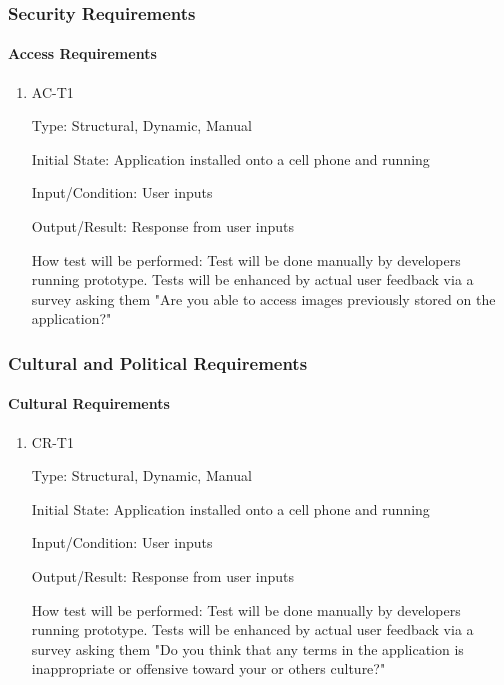 \documentclass[12pt, titlepage]{article}
\begin{document}
\subsubsection{Security Requirements}
		
\paragraph{Access Requirements}

\begin{enumerate}

\item{AC-T1\\}

Type: Structural, Dynamic, Manual
					
Initial State: Application installed onto a cell phone and running
					
Input/Condition: User inputs
					
Output/Result: Response from user inputs
					
How test will be performed: Test will be done manually by developers running prototype. Tests will be enhanced by actual user feedback via a survey asking them "Are you able to access images previously stored on the application?"

\end{enumerate}

\subsubsection{Cultural and Political Requirements}
		
\paragraph{Cultural Requirements}

\begin{enumerate}

\item{CR-T1\\}

Type: Structural, Dynamic, Manual
					
Initial State: Application installed onto a cell phone and running
					
Input/Condition: User inputs
					
Output/Result: Response from user inputs
					
How test will be performed: Test will be done manually by developers running prototype. Tests will be enhanced by actual user feedback via a survey asking them "Do you think that any terms in the application is inappropriate or offensive toward your or others culture?"

\end{enumerate}
\end{document}
